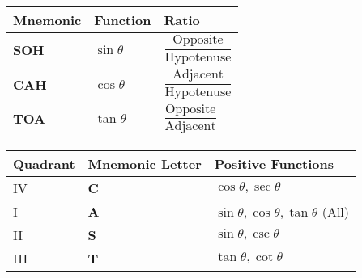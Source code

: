 \begin{NxLightBox}[title={SOH–CAH–TOA Trigonometric Ratios}]
	\begin{tabularx}{\linewidth}{|X|X|X|}
		\hline
		\textbf{Mnemonic} & \textbf{Function} & \textbf{Ratio} \\
		\hline
		\textbf{SOH} & \( \sin\theta \) & \( \dfrac{\text{Opposite}}{\text{Hypotenuse}} \) \\
		\hline
		\textbf{CAH} & \( \cos\theta \) & \( \dfrac{\text{Adjacent}}{\text{Hypotenuse}} \) \\
		\hline
		\textbf{TOA} & \( \tan\theta \) & \( \dfrac{\text{Opposite}}{\text{Adjacent}} \) \\
		\hline
	\end{tabularx}
\end{NxLightBox}
\bigskip

\begin{NxLightBox}[title={CAST Rule — Trigonometric Signs by Quadrant}]
	\begin{tabularx}{\linewidth}{|l|X|X|}
		\hline
		\textbf{Quadrant} & \textbf{Mnemonic Letter} & \textbf{Positive Functions} \\
		\hline
		IV & \textbf{C} & \( \cos\theta, \sec\theta \) \\
		\hline
		I & \textbf{A} & \( \sin\theta, \cos\theta, \tan\theta \) (All) \\
		\hline
		II & \textbf{S} & \( \sin\theta, \csc\theta \) \\
		\hline
		III & \textbf{T} & \( \tan\theta, \cot\theta \) \\
		\hline
	\end{tabularx}
\end{NxLightBox}
\bigskip

